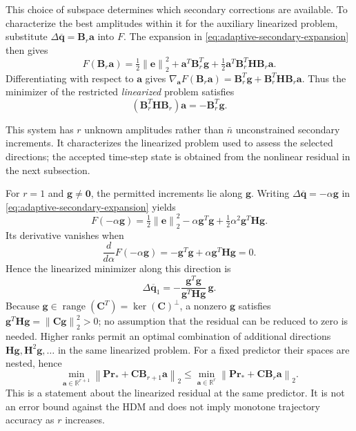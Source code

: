 \documentclass[11pt]{article}
\newcommand{\qbar}{\overline{\mathbf q}}
\newcommand{\norm}[1]{\left\lVert #1 \right\rVert}
\begin{document}
\begin{samepage}
This choice of subspace determines which secondary corrections are
available.  To characterize the best amplitudes within it for the
auxiliary linearized problem, substitute
$\Delta\qbar=\mathbf B_r\mathbf a$ into $F$.  The expansion in
\eqref{eq:adaptive-secondary-expansion} then gives
\begin{equation*}
F(\mathbf B_r\mathbf a)
=\tfrac12\norm{\mathbf e}_2^2
+\mathbf a^T\mathbf B_r^T\mathbf g
+\tfrac12\mathbf a^T\mathbf B_r^T\mathbf H\mathbf B_r\mathbf a.
\end{equation*}
Differentiating with respect to $\mathbf a$ gives
$\nabla_{\mathbf a}F(\mathbf B_r\mathbf a)
=\mathbf B_r^T\mathbf g+\mathbf B_r^T\mathbf H\mathbf B_r\mathbf a$.
Thus the minimizer of the restricted \emph{linearized} problem satisfies
\begin{equation}
(\mathbf B_r^T\mathbf H\mathbf B_r)\mathbf a
=-\mathbf B_r^T\mathbf g.
\label{eq:adaptive-restricted-normal-equations}
\end{equation}
\end{samepage}
This system has $r$ unknown amplitudes rather than $\bar n$
unconstrained secondary increments.  It characterizes the linearized
problem used to assess the selected directions; the accepted time-step
state is obtained from the nonlinear residual in the next subsection.

For $r=1$ and $\mathbf g\ne\mathbf0$, the permitted increments lie
along $\mathbf g$.  Writing $\Delta\qbar=-\alpha\mathbf g$ in
\eqref{eq:adaptive-secondary-expansion} yields
\begin{equation*}
F(-\alpha\mathbf g)
=\tfrac12\norm{\mathbf e}_2^2
-\alpha\mathbf g^T\mathbf g
+\tfrac12\alpha^2\mathbf g^T\mathbf H\mathbf g.
\end{equation*}
Its derivative vanishes when
\begin{equation*}
\frac{d}{d\alpha}F(-\alpha\mathbf g)
=-\mathbf g^T\mathbf g+\alpha\mathbf g^T\mathbf H\mathbf g=0.
\end{equation*}
Hence the linearized minimizer along this direction is
\begin{equation}
\Delta\qbar_1=-\frac{\mathbf g^T\mathbf g}
{\mathbf g^T\mathbf H\mathbf g}\,\mathbf g.
\label{eq:adaptive-rank-one}
\end{equation}
Because
$\mathbf g\in\operatorname{range}(\mathbf C^T)=\ker(\mathbf C)^\perp$,
a nonzero $\mathbf g$ satisfies
$\mathbf g^T\mathbf H\mathbf g=\norm{\mathbf C\mathbf g}_2^2>0$;
no assumption that the residual can be reduced to zero is needed.
Higher ranks permit an optimal combination of additional directions
$\mathbf H\mathbf g,\mathbf H^2\mathbf g,\ldots$ in the same
linearized problem.  For a fixed predictor their spaces are nested, hence
\begin{equation}
\min_{\mathbf a\in\mathbb R^{r+1}}
\norm{\mathbf P\mathbf r_*+\mathbf C\mathbf B_{r+1}\mathbf a}_2
\leq
\min_{\mathbf a\in\mathbb R^r}
\norm{\mathbf P\mathbf r_*+\mathbf C\mathbf B_r\mathbf a}_2.
\label{eq:adaptive-nested-bound}
\end{equation}
This is a statement about the linearized residual at the same predictor.
It is not an error bound against the HDM and does not imply monotone
trajectory accuracy as $r$ increases.
\end{document}

